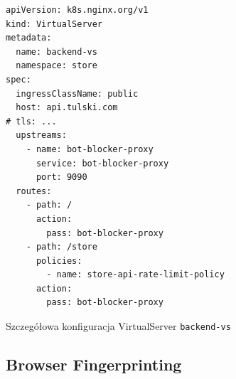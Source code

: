 \begin{listing}[p]
    \begin{verbatim}
apiVersion: k8s.nginx.org/v1
kind: VirtualServer
metadata:
  name: backend-vs
  namespace: store
spec:
  ingressClassName: public
  host: api.tulski.com
# tls: ...
  upstreams:
    - name: bot-blocker-proxy
      service: bot-blocker-proxy
      port: 9090
  routes:
    - path: /
      action:
        pass: bot-blocker-proxy
    - path: /store
      policies:
        - name: store-api-rate-limit-policy
      action:
        pass: bot-blocker-proxy
    \end{verbatim}
    \caption{Szczegółowa konfiguracja VirtualServer \texttt{backend-vs}}
    \label{lst:rate-limiting-virtual-server}
\end{listing}

\newpage

\subsection{Browser Fingerprinting}


\newpage
